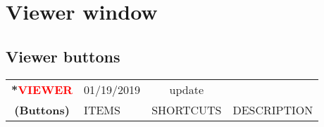 \section{Viewer window }%
\label{sec:viewer_window}

\subsection{Viewer buttons }%
\label{ssec:viewer_buttons}

\begin{center}
    \small 
    \begin{longtable}{ >{\bfseries}c l c p{6cm}}             
        \toprule
        \multirow{2}*{\textcolor{red}{VIEWER}} & 01/19/2019 & update & \\
        \noalign{\smallskip}
        \cline{2-4}
        \noalign{\smallskip}
        (Buttons) & ITEMS & SHORTCUTS & DESCRIPTION\\
        \midrule        
        \endhead   
        

\end{longtable}
\end{center}
